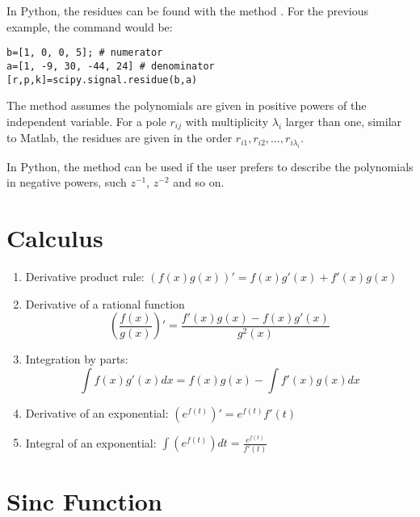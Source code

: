 In Python, the residues can be found with the method . 
For the previous example, the command would be:
\begin{lstlisting}
b=[1, 0, 0, 5]; # numerator
a=[1, -9, 30, -44, 24] # denominator
[r,p,k]=scipy.signal.residue(b,a)
\end{lstlisting}
The method  assumes the polynomials are given in positive powers
of the independent variable. For a pole $r_{ij}$ with multiplicity $\lambda_i$ larger than one, 
similar to Matlab, the residues are given in the order $r_{i1},r_{i2},\ldots,r_{i \lambda_i}$.
 
In Python, the method  can be used if the user prefers to describe
the polynomials
in negative powers, such $z^{-1}$, $z^{-2}$ and so on.

\section{Calculus}
\label{sec:calculus}

\begin{enumerate}

\item Derivative product rule: $(f(x) g(x))' = f(x) g'(x) + f'(x) g(x)$

\item Derivative of a rational function 
\begin{equation}
\left(\frac{f(x)}{g(x)}\right)' = \frac{f'(x) g(x) - f(x) g'(x)}{g^2(x)}
\label{eq:derivative_rational}
\end{equation}



\item Integration by parts: 
\begin{equation}
\int{f(x)g'(x)dx}=f(x)g(x)- \int{f'(x)g(x)}dx
\label{eq:integration_parts}
\end{equation}

\item Derivative of an exponential: $(e^{f(t)})' = e^{f(t)} f'(t)$

\item Integral of an exponential: $\int{(e^{f(t)})}dt = \frac {e^{f(t)}} {f'(t)}$

\end{enumerate}

\section{Sinc Function}
\label{sec:sinc}

